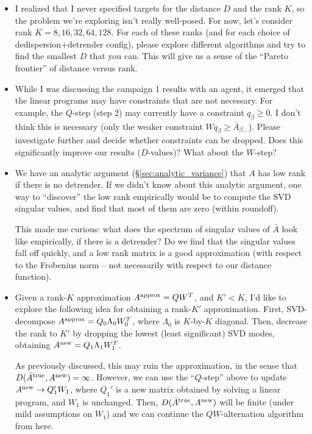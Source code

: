 \documentclass{article}
\numberwithin{equation}{section}   %
\begin{document}
\begin{itemize}

\item
I realized that I never specified targets for the distance $D$ and the rank $K$, so
the problem we're exploring isn't really well-posed.
For now, let's consider rank $K=8,16,32,64,128$.
For each of these ranks (and for each choice of dedispersion+detrender config),
please explore different algorithms and try to find the smallest $D$ that you can.
This will give us a sense of the ``Pareto frontier'' of distance versus rank.

\item While I was discussing the campaign 1 results with an agent, it emerged that 
 the linear programs may have constraints that are not necessary.
 For example, the $Q$-step (step 2) may currently have a constraint $q_\beta \ge 0$.
 I don't think this is necessary (only the weaker constraint $W q_\beta \ge \bar A_{\beta,:}$).
 Please investigate further and decide whether constraints can be dropped.
 Does this significantly improve our results ($D$-values)?
 What about the $W$-step?

\item We have an analytic argument (\S\ref{sec:analytic_variance}) that $A$
 has low rank if there is no detrender. If we didn't know about this analytic
 argument, one way to ``discover'' the low rank empirically would be to compute
 the SVD singular values, and find that most of them are zero (within roundoff).

 This made me curious: what does the spectrum of singular values of $\bar A$ 
 look like empirically, if there is a detrender? Do we find that the singular
 values fall off quickly, and a low rank matrix is a good approximation (with 
 respect to the Frobenius norm -- not necessarily with respect to our distance 
 function).

\item Given a rank-$K$ approximation $A^{\rm approx} = Q W^T$, and $K' < K$,
 I'd like to explore the following idea for obtaining a rank-$K'$ approximation.
 First, SVD-decompose $A^{\rm approx} = Q_0 \Lambda_0 W_0^T$, where $\Lambda_0$ is
 $K$-by-$K$ diagonal. Then, decrease the rank to $K'$ by dropping the lowest 
 (least significant) SVD modes, obtaining $A^{\rm new} = Q_1 \Lambda_1 W_1^T$.

 As previously discussed, this may ruin the approximation, in the sense that
 $D(\bar A^{\rm true}, A^{\rm new})=\infty$. However, we can use the ``$Q$-step''
 above to update $A^{\rm new} \rightarrow Q_1' W_1$, where $Q_1'$ is a new
 matrix obtained by solving a linear program, and $W_1$ is unchanged.
 Then, $D(\bar A^{\rm true}, A^{\rm new})$ will be finite (under mild assumptions
 on $W_1$) and we can continue the $QW$-alternation algorithm from here.


\end{itemize}
\end{document}
